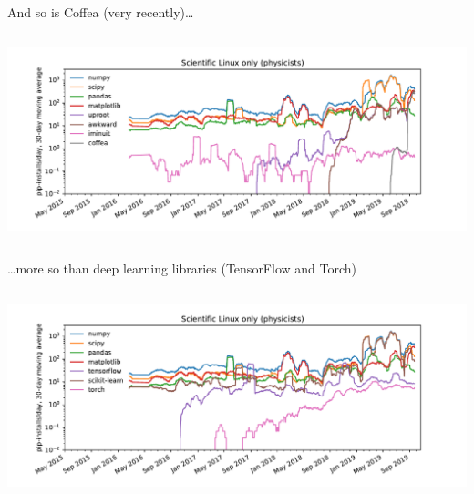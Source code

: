 \documentclass[aspectratio=169]{beamer}
\begin{document}
\begin{frame}{And so is Coffea (very recently)\ldots}
\vspace{0.5 cm}
\begin{columns}
\includegraphics[width=\linewidth]{pip-scilinux-uproot-iminuit.pdf}
\end{columns}
\end{frame}

\begin{frame}{\ldots more so than deep learning libraries (TensorFlow and Torch)}
\vspace{0.5 cm}
\begin{columns}
\includegraphics[width=\linewidth]{pip-scilinux-ml.pdf}
\end{columns}
\end{frame}
\end{document}
